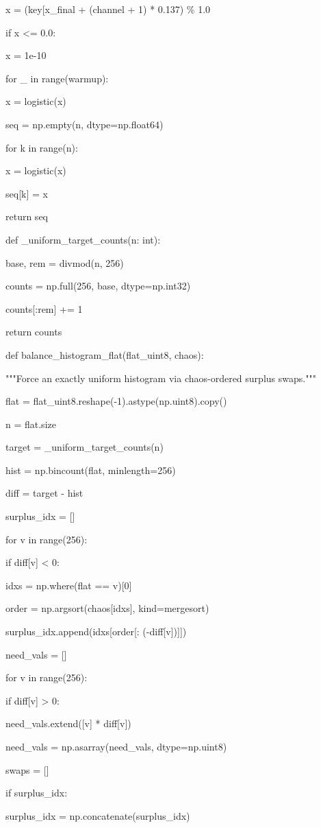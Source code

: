 x = (key{[}\textquotesingle x\_final\textquotesingle{]} + (channel + 1) * 0.137) \% 1.0

if x \textless= 0.0:

x = 1e-10

for \_ in range(warmup):

x = logistic(x)

seq = np.empty(n, dtype=np.float64)

for k in range(n):

x = logistic(x)

seq{[}k{]} = x

return seq

def \_uniform\_target\_counts(n: int):

base, rem = divmod(n, 256)

counts = np.full(256, base, dtype=np.int32)

counts{[}:rem{]} += 1

return counts

def balance\_histogram\_flat(flat\_uint8, chaos):

"""Force an exactly uniform histogram via chaos-ordered surplus swaps."""

flat = flat\_uint8.reshape(-1).astype(np.uint8).copy()

n = flat.size

target = \_uniform\_target\_counts(n)

hist = np.bincount(flat, minlength=256)

diff = target - hist

surplus\_idx = {[}{]}

for v in range(256):

if diff{[}v{]} \textless{} 0:

idxs = np.where(flat == v){[}0{]}

order = np.argsort(chaos{[}idxs{]}, kind=\textquotesingle mergesort\textquotesingle)

surplus\_idx.append(idxs{[}order{[}: (-diff{[}v{]}){]}{]})

need\_vals = {[}{]}

for v in range(256):

if diff{[}v{]} \textgreater{} 0:

need\_vals.extend({[}v{]} * diff{[}v{]})

need\_vals = np.asarray(need\_vals, dtype=np.uint8)

swaps = {[}{]}

if surplus\_idx:

surplus\_idx = np.concatenate(surplus\_idx)

